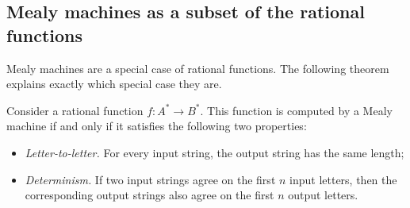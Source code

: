 \subsection{Mealy machines as a subset of the rational functions}
\label{sec:mealy-machines-and-rational-functions}

Mealy machines are a special case of rational functions. The following theorem explains exactly which special case they are. 
\begin{theorem}\label{thm:rational-is-mealy-characterisation}
Consider a rational function $f : A^* \to B^*$. This function is computed by a Mealy machine if and only if it satisfies the following two properties:
\begin{itemize}
    \item \emph{Letter-to-letter.} For every input string, the output string has the same length;
    \item \emph{Determinism.} If two input strings agree on the first $n$ input letters, then the corresponding output strings also agree on the first $n$ output letters.
\end{itemize}
\end{theorem}


\exerciseheader



